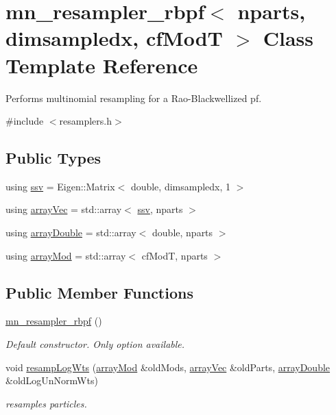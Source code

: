 \hypertarget{classmn__resampler__rbpf}{}\section{mn\+\_\+resampler\+\_\+rbpf$<$ nparts, dimsampledx, cf\+ModT $>$ Class Template Reference}
\label{classmn__resampler__rbpf}


Performs multinomial resampling for a Rao-\/\+Blackwellized pf.  




{\ttfamily \#include $<$resamplers.\+h$>$}

\subsection*{Public Types}
\begin{DoxyCompactItemize}
\item 
using \hyperlink{classmn__resampler__rbpf_ad5cb01bd12049869984517aa752f6cf6}{ssv} = Eigen\+::\+Matrix$<$ double, dimsampledx, 1 $>$
\item 
using \hyperlink{classmn__resampler__rbpf_ac83764e4eea811b1b76bd2e76de652c9}{array\+Vec} = std\+::array$<$ \hyperlink{classmn__resampler__rbpf_ad5cb01bd12049869984517aa752f6cf6}{ssv}, nparts $>$
\item 
using \hyperlink{classmn__resampler__rbpf_aff8066438dd0932f3ee0602ed1079d3d}{array\+Double} = std\+::array$<$ double, nparts $>$
\item 
using \hyperlink{classmn__resampler__rbpf_adcee7a8490a643233d56f6ba7f1373ee}{array\+Mod} = std\+::array$<$ cf\+ModT, nparts $>$
\end{DoxyCompactItemize}
\subsection*{Public Member Functions}
\begin{DoxyCompactItemize}
\item 
\hyperlink{classmn__resampler__rbpf_a1fad3080bbdbd5f8876a79107774e605}{mn\+\_\+resampler\+\_\+rbpf} ()\hypertarget{classmn__resampler__rbpf_a1fad3080bbdbd5f8876a79107774e605}{}\label{classmn__resampler__rbpf_a1fad3080bbdbd5f8876a79107774e605}

\begin{DoxyCompactList}\small\item\em Default constructor. Only option available. \end{DoxyCompactList}\item 
void \hyperlink{classmn__resampler__rbpf_ae7093100fe2d7c3c91b1764ce724354c}{resamp\+Log\+Wts} (\hyperlink{classmn__resampler__rbpf_adcee7a8490a643233d56f6ba7f1373ee}{array\+Mod} \&old\+Mods, \hyperlink{classmn__resampler__rbpf_ac83764e4eea811b1b76bd2e76de652c9}{array\+Vec} \&old\+Parts, \hyperlink{classmn__resampler__rbpf_aff8066438dd0932f3ee0602ed1079d3d}{array\+Double} \&old\+Log\+Un\+Norm\+Wts)
\begin{DoxyCompactList}\small\item\em resamples particles. \end{DoxyCompactList}\end{DoxyCompactItemize}
